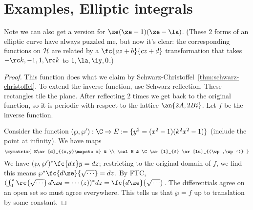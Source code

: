 \section{Examples, Elliptic integrals}
Note we can also get a version for $\ze(\ze-1)(\ze-\la)$. (These 2 forms of an elliptic curve have always puzzled me, but now it's clear: the corresponding functions on $\cal H$ are related by  a $\fc{az+b}{cz+d}$ transformation that takes $-\rc k, -1, 1, \rc k$ to $1,\la,\iy,0$.)
\begin{proof}
This function does what we claim by Schwarz-Christoffel~\ref{thm:schwarz-christoffel}. To extend the inverse function, use Schwarz reflection. These rectangles tile the plane. After reflecting 2 times we get back to the original function, so it is periodic with respect to the lattice $\an{2A,2Bi}$. Let $f$ be the inverse function.

Consider the function $(\wp, \wp'):\C\to E:=\{y^2=(x^2-1)(k^2x^2-1)\}$ (include the point at infinity). We have maps
\[
\xymatrix{
E\ar[d]_{(x,y)\mapsto x} & \\
\cal H & \C\ar[l]_{f} \ar[lu]_{(\wp,\wp')}
}
\]
We have $(\wp,\wp')^*\fc{dx}y = dz$; restricting to the original domain of $f$, we find this means $\wp^*\fc{d\ze}{\sqrt{\cdots}} = dz$. By FTC, $(\int_0^z\rc{\sqrt{\cdots}} \,d\ze=\cdots(z))^* dz = \fc{d\ze}{\sqrt{\cdots}}$. The differentials agree on an open set so must agree everywhere. This tells us that $\wp = f$ up to translation by some constant. 
\end{proof}

%
 
%
%
